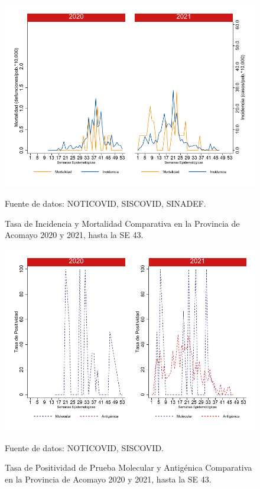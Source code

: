 \documentclass[12pt,a4paper,openany]{book}
\begin{document}
		\begin{figure}[h]
			\caption{Tasa de Incidencia y Mortalidad Comparativa en la Provincia de Acomayo 2020 y 2021, hasta la SE 43. }\label{fig:inc_mort_acomayo}
			\begin{center}
				\includegraphics[width=0.7\linewidth]{../figuras/incidencia_mortalidad_20_21_1}
			\end{center}
			{\footnotesize {Fuente de datos: NOTICOVID, SISCOVID, SINADEF.}}
		\end{figure}
		
		\begin{figure}[h]
			\caption{Tasa de Positividad de Prueba Molecular y Antigénica Comparativa en la Provincia de Acomayo 2020 y 2021, hasta la SE 43. }\label{fig:positividad_acomayo}
			\begin{center}
				\includegraphics[width=0.7\linewidth]{../figuras/positividad_20_21_1}
			\end{center}
			{\footnotesize {Fuente de datos: NOTICOVID, SISCOVID.}}
		\end{figure}
		
\end{document}
